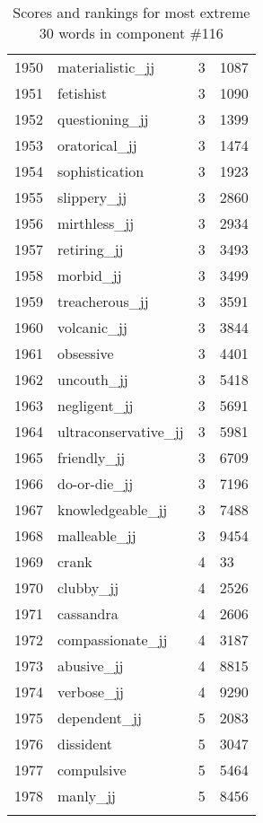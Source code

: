 \begin{longtable}[!htbp]{| rlr@{.}l |}
    1950 & materialistic\_jj & 3 & 1087 \\
    1951 & fetishist & 3 & 1090 \\
    1952 & questioning\_jj & 3 & 1399 \\
    1953 & oratorical\_jj & 3 & 1474 \\
    1954 & sophistication & 3 & 1923 \\
    1955 & slippery\_jj & 3 & 2860 \\
    1956 & mirthless\_jj & 3 & 2934 \\
    1957 & retiring\_jj & 3 & 3493 \\
    1958 & morbid\_jj & 3 & 3499 \\
    1959 & treacherous\_jj & 3 & 3591 \\
    1960 & volcanic\_jj & 3 & 3844 \\
    1961 & obsessive & 3 & 4401 \\
    1962 & uncouth\_jj & 3 & 5418 \\
    1963 & negligent\_jj & 3 & 5691 \\
    1964 & ultraconservative\_jj & 3 & 5981 \\
    1965 & friendly\_jj & 3 & 6709 \\
    1966 & do-or-die\_jj & 3 & 7196 \\
    1967 & knowledgeable\_jj & 3 & 7488 \\
    1968 & malleable\_jj & 3 & 9454 \\
    1969 & crank & 4 & 33 \\
    1970 & clubby\_jj & 4 & 2526 \\
    1971 & cassandra & 4 & 2606 \\
    1972 & compassionate\_jj & 4 & 3187 \\
    1973 & abusive\_jj & 4 & 8815 \\
    1974 & verbose\_jj & 4 & 9290 \\
    1975 & dependent\_jj & 5 & 2083 \\
    1976 & dissident & 5 & 3047 \\
    1977 & compulsive & 5 & 5464 \\
    1978 & manly\_jj & 5 & 8456 \\
    \hline
    \caption{Scores and rankings for most extreme 30 words in component \#116} \\
\end{longtable}
